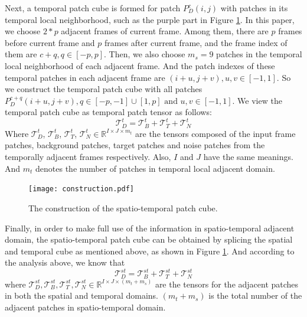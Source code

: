 \documentclass[journal]{IEEEtran}
\begin{document}
Next, a temporal patch cube is formed for patch $P_D^c(i,j)$ with patches in its temporal local neighborhood, such as the purple part in Figure \ref{construction}. In this paper, we choose $2*p$ adjacent frames of current frame. Among them, there are $p$ frames before current frame and $p$ frames after current frame, and the frame index of them are $c+q,q\in [-p,p]$. Then, we also choose $m_s=9$ patches in the temporal local neighborhood of each adjacent frame. And the patch indexes of these temporal patches in each adjacent frame are $(i+u,j+v),u,v \in [-1,1]$. So we construct the temporal patch cube with all patches $P_D^{c+q}(i+u,j+v),q\in [-p,-1]\cup[1,p]\text{ and }u,v \in [-1,1]$. We view the temporal patch cube as temporal patch tensor as follows:
\begin{equation}
    \bm{\mathcal T}_D^t = \bm{\mathcal T}_B^t + \bm{\mathcal T}_T^t + \bm{\mathcal T}_N^t 
  \label{eq:temporal_tensor_model}
\end{equation}
 Where $\bm{\mathcal T}_D^t$, $\bm{\mathcal T}_B^t$, $\bm{\mathcal T}_T^t$, $\bm{\mathcal T}_N^t \in {\mathbb R}^{{I}\times{J}\times{m_t}}$ are the tensors composed of the input frame patches, background patches, target patches and noise patches from the temporally adjacent frames respectively. Also, $I$ and $J$ have the same meanings. And $m_t$ denotes the number of patches in temporal local adjacent domain.

 \begin{figure}[H]
  \centering
  \texttt{[image: construction.pdf]}
  \caption{The construction of the spatio-temporal patch cube.}
  \label{construction}
\end{figure}

Finally, in order to make full use of the information in spatio-temporal adjacent domain, the spatio-temporal patch cube can be obtained by splicing the spatial and temporal cube as mentioned above, as shown in Figure \ref{construction}. And according to the analysis above, we know that
\begin{equation}
  \bm{\mathcal T}_D^{st} = \bm{\mathcal T}_B^{st} + \bm{\mathcal T}_T^{st} + \bm{\mathcal T}_N^{st}
  \label{eq:spatio_temporal_tensor_model}
\end{equation}
where $\bm{\mathcal T}_D^{st},\bm{\mathcal T}_B^{st},\bm{\mathcal T}_T^{st},\bm{\mathcal T}_N^{st} \in {\mathbb R}^{{I}\times{J}\times{(m_t+m_s)}}$ are the tensors for the adjacent patches in both the spatial and temporal domains. $(m_t+m_s)$ is the total number of the adjacent patches in spatio-temporal domain.
\end{document}
